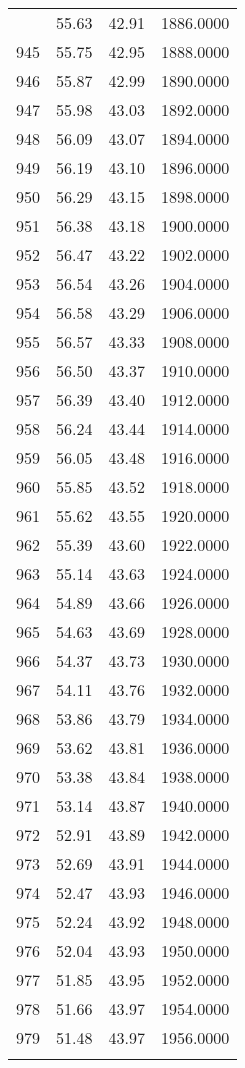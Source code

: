 \documentclass[
  captions=tableheading,
]{scrartcl}
\begin{document}
\begin{longtable} {l|l|l|l}
{944 &	55.63 &	42.91 &	1886.0000\\
945 &	55.75 &	42.95 &	1888.0000\\
946 &	55.87 &	42.99 &	1890.0000\\
947 &	55.98 &	43.03 &	1892.0000\\
948 &	56.09 &	43.07 &	1894.0000\\
949 &	56.19 &	43.10 &	1896.0000\\
950 &	56.29 &	43.15 &	1898.0000\\
951 &	56.38 &	43.18 &	1900.0000\\
952 &	56.47 &	43.22 &	1902.0000\\
953 &	56.54 &	43.26 &	1904.0000\\
954 &	56.58 &	43.29 &	1906.0000\\
955 &	56.57 &	43.33 &	1908.0000\\
956 &	56.50 &	43.37 &	1910.0000\\
957 &	56.39 &	43.40 &	1912.0000\\
958 &	56.24 &	43.44 &	1914.0000\\
959 &	56.05 &	43.48 &	1916.0000\\
960 &	55.85 &	43.52 &	1918.0000\\
961 &	55.62 &	43.55 &	1920.0000\\
962 &	55.39 &	43.60 &	1922.0000\\
963 &	55.14 &	43.63 &	1924.0000\\
964 &	54.89 &	43.66 &	1926.0000\\
965 &	54.63 &	43.69 &	1928.0000\\
966 &	54.37 &	43.73 &	1930.0000\\
967 &	54.11 &	43.76 &	1932.0000\\
968 &	53.86 &	43.79 &	1934.0000\\
969 &	53.62 &	43.81 &	1936.0000\\
970 &	53.38 &	43.84 &	1938.0000\\
971 &	53.14 &	43.87 &	1940.0000\\
972 &	52.91 &	43.89 &	1942.0000\\
973 &	52.69 &	43.91 &	1944.0000\\
974 &	52.47 &	43.93 &	1946.0000\\
975 &	52.24 &	43.92 &	1948.0000\\
976 &	52.04 &	43.93 &	1950.0000\\
977 &	51.85 &	43.95 &	1952.0000\\
978 &	51.66 &	43.97 &	1954.0000\\
979 &	51.48 &	43.97 &	1956.0000\\
}
\end{longtable}
\end{document}

